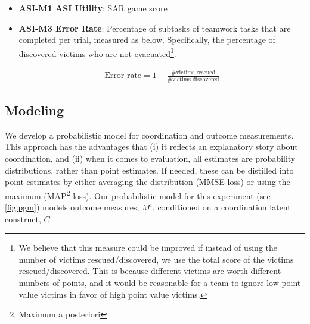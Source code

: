 \begin{itemize}

    \item \textbf{ASI-M1 ASI Utility}: SAR game score 

    \item \textbf{ASI-M3 Error Rate}: Percentage of subtasks of teamwork tasks
        that are completed per trial, measured as below.  Specifically, the
        percentage of discovered victims who are not evacuated\footnote{We
            believe that this measure could be improved if instead of using the
            number of victims rescued/discovered, we use the total score of the
            victims rescued/discovered. This is because different victims are
            worth different numbers of points, and it would be reasonable for a
            team to ignore low point value victims in favor of high point value
        victims.}. 

        \begin{align}
            \text{Error rate} = 1 - \frac{\text{\# victims rescued}}{\text{\# victims discovered}}
        \end{align}

\end{itemize}

\subsection{Modeling}
\label{subsec:modeling}

    We develop a probabilistic model for coordination and outcome measurements.
    This approach has the advantages that (i) it reflects an explanatory story
    about coordination, and (ii) when it comes to evaluation, all estimates are
    probability distributions, rather than point estimates.  If needed, these
    can be distilled into point estimates by either averaging the distribution
    (MMSE loss) or using the maximum (MAP\footnote{Maximum a posteriori} loss). 
    Our probabilistic model for this experiment (see \autoref{fig:pgm}) models
    outcome measures, $M^i$, conditioned on a coordination latent construct,
    $C$. 

